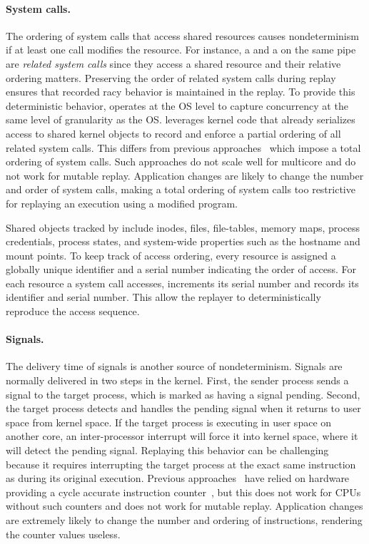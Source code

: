 \paragraph{System calls.}
The ordering of system calls that access shared resources causes nondeterminism
if at least one call modifies the resource.
For instance, a  and a  on the same
pipe are \emph{related system calls} since they access a shared resource and
their relative ordering matters.  Preserving the order of related
system calls during replay ensures that recorded racy behavior is maintained in
the replay.
To provide this deterministic behavior, {\dora} operates at the OS level to
capture concurrency at the same level of granularity as the OS.
{\dora} leverages
kernel code that already serializes access to
shared kernel objects to record and enforce a partial ordering of all related
system calls.
This differs from previous approaches~\cite{r2:osdi,srinivasan:flashback} 
which impose a total ordering of system calls.  Such approaches do
not scale well for multicore and do not work for mutable
replay. Application changes are likely to change the number and order
of system calls, making a total ordering of system calls too
restrictive for replaying an execution using a modified program.  

Shared objects tracked by {\dora} include inodes, files,
file-tables, memory maps, process credentials, process states, and
system-wide properties such as the hostname and mount points.
To keep track of access ordering, every resource is assigned a
globally unique identifier and a serial number indicating the order of access.
For each resource a system call accesses, {\dora} increments its serial
number and records its identifier and serial number. This allow
the replayer to deterministically reproduce the access sequence.

\paragraph{Signals.}
The delivery time of signals is another source of nondeterminism.
Signals are normally delivered in two steps in the kernel.  First, the sender process sends a
signal to the target process, which is marked as having a signal
pending.  Second, the target process detects and handles the pending signal when
it returns to user space from kernel space.  If the target process
is executing in user space on another core, an inter-processor interrupt will force it
into kernel space, where it will detect the pending signal.
Replaying this behavior can be challenging because it requires
interrupting the target process at the exact same instruction as
during its original execution.  Previous
approaches~\cite{bressoud-tft,bressoud,revirt,smp-revirt:vee08}
have relied on hardware providing a cycle accurate instruction
counter~\cite{replica-nondet:ftcs96}, but this does not work for CPUs
without such counters and does not work for mutable replay.
Application changes are extremely likely to change the number and
ordering of instructions, rendering the counter values useless.

